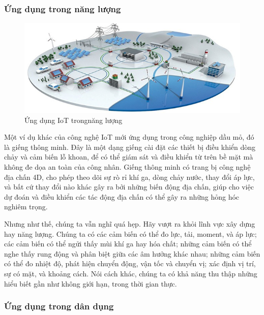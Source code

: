 \subsubsection*{Ứng dụng trong năng lượng }

\begin{figure}[H] 
\centering    
\includegraphics[width=1\textwidth]{pic9}
\caption[Ứng dụng IoT trong năng lượng]{Ứng dụng IoT trongnăng lượng}
\label{fig:pic9}
\end{figure}
Một ví dụ khác của công nghệ IoT mới ứng dụng trong công nghiệp dầu mỏ, đó là giếng thông minh. Đây là một dạng giếng cài đặt các thiết bị điều khiển dòng chảy và cảm biến lỗ khoan, để có thể giám sát và điều khiển từ trên bề mặt mà không đe dọa an toàn của công nhân. Giếng thông minh có trang bị công nghệ địa chấn 4D, cho phép theo dõi sự rò rỉ khí ga, dòng chảy nước, thay đổi áp lực, và bất cứ thay đổi nào khác gây ra bởi những biến động địa chấn, giúp cho việc dự đoán và điều khiển các tác động địa chấn có thể gây ra những hỏng hóc nghiêm trọng.

Nhưng như thế, chúng ta vẫn nghĩ quá hẹp. Hãy vượt ra khỏi lĩnh vực xây dựng hay năng lượng. Chúng ta có các cảm biến có thể đo lực, tải, moment, và áp lực; các cảm biến có thể ngửi thấy mùi khí ga hay hóa chất; những cảm biến có thể nghe thấy rung động và phân biệt giữa các âm hưởng khác nhau; những cảm biến có thể đo nhiệt độ, phát hiện chuyển động, vận tốc và chuyển vị; xác định vị trí, sự có mặt, và khoảng cách. Nói cách khác, chúng ta có khả năng thu thập những hiểu biết gần như không giới hạn, trong thời gian thực.

\subsubsection*{Ứng dụng trong dân dụng  }

